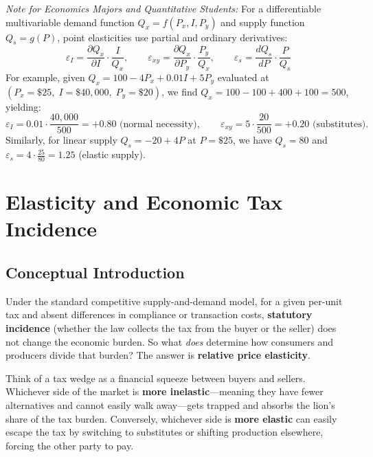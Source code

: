 \documentclass[11pt,letterpaper]{article}
\begin{document}
\begin{tcolorbox}[colback=CourseBlue!6!white,colframe=CourseBlue,title=\textbf{Optional Advanced Section: Point Income, Cross-Price, and Supply Elasticities}]
\small
\emph{Note for Economics Majors and Quantitative Students:}
For a differentiable multivariable demand function $Q_x = f(P_x, I, P_y)$ and supply function $Q_s = g(P)$, point elasticities use partial and ordinary derivatives:
\[
\varepsilon_I = \frac{\partial Q_x}{\partial I} \cdot \frac{I}{Q_x}, \qquad \varepsilon_{xy} = \frac{\partial Q_x}{\partial P_y} \cdot \frac{P_y}{Q_x}, \qquad \varepsilon_s = \frac{dQ_s}{dP} \cdot \frac{P}{Q_s}
\]
For example, given $Q_x = 100 - 4P_x + 0.01I + 5P_y$ evaluated at $(P_x = \$25,\; I = \$40{,}000,\; P_y = \$20)$, we find $Q_x = 100 - 100 + 400 + 100 = 500$, yielding:
\[
\varepsilon_I = 0.01 \cdot \frac{40{,}000}{500} = +0.80 \text{ (normal necessity)}, \qquad \varepsilon_{xy} = 5 \cdot \frac{20}{500} = +0.20 \text{ (substitutes)}.
\]
Similarly, for linear supply $Q_s = -20 + 4P$ at $P = \$25$, we have $Q_s = 80$ and $\varepsilon_s = 4 \cdot \frac{25}{80} = 1.25$ (elastic supply).
\end{tcolorbox}

\section{Elasticity and Economic Tax Incidence}

\subsection*{Conceptual Introduction}
Under the standard competitive supply-and-demand model, for a given per-unit tax and absent differences in compliance or transaction costs, \textbf{statutory incidence} (whether the law collects the tax from the buyer or the seller) does not change the economic burden. So what \emph{does} determine how consumers and producers divide that burden? The answer is \textbf{relative price elasticity}.

Think of a tax wedge as a financial squeeze between buyers and sellers. Whichever side of the market is \textbf{more inelastic}—meaning they have fewer alternatives and cannot easily walk away—gets trapped and absorbs the lion's share of the tax burden. Conversely, whichever side is \textbf{more elastic} can easily escape the tax by switching to substitutes or shifting production elsewhere, forcing the other party to pay.
\end{document}
